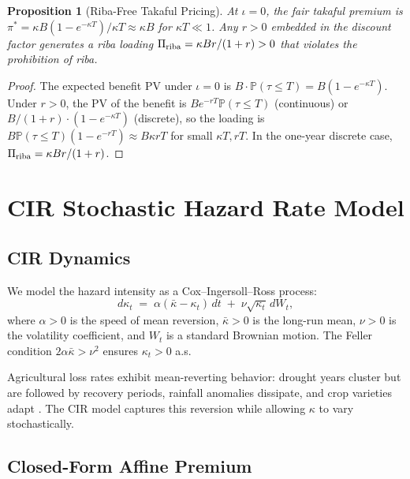 \documentclass[12pt,a4paper]{article}
\newtheorem{proposition}[theorem]{Proposition}
\newcommand{\kbar}{\bar{\kappa}}
\newcommand{\Prob}{\mathbb{P}}
\begin{document}
\begin{proposition}[Riba-Free Takaful Pricing]
  \label{prop:riba_free}
  At $\iota=0$, the fair takaful premium is $\pi^* = \kappa B(1-e^{-\kappa T})/\kappa T
  \approx \kappa B$ for $\kappa T \ll 1$.
  Any $r>0$ embedded in the discount factor generates a riba loading
  $\Pi_{\rm riba} = \kappa B r/(1+r) > 0$ that violates the prohibition of riba.
\end{proposition}

\begin{proof}
  The expected benefit PV under $\iota=0$ is $B\cdot\Prob(\tau\leq T)=B(1-e^{-\kappa T})$.
  Under $r>0$, the PV of the benefit is $B e^{-rT}\Prob(\tau\leq T)$ (continuous) or
  $B/(1+r)\cdot(1-e^{-\kappa T})$ (discrete), so the loading is
  $B\Prob(\tau\leq T)(1-e^{-rT})\approx B\kappa r T$ for small $\kappa T,rT$.
  In the one-year discrete case, $\Pi_{\rm riba}=\kappa B r/(1+r)$.
\end{proof}

\section{CIR Stochastic Hazard Rate Model}
\label{sec:cir}

\subsection{CIR Dynamics}

We model the hazard intensity as a Cox--Ingersoll--Ross process:
\begin{equation}
  d\kappa_t \;=\; \alpha(\kbar - \kappa_t)\,dt \;+\; \nu\sqrt{\kappa_t}\,dW_t,
  \label{eq:cir}
\end{equation}
where $\alpha>0$ is the speed of mean reversion, $\kbar>0$ is the long-run mean,
$\nu>0$ is the volatility coefficient, and $W_t$ is a standard Brownian motion.
The Feller condition $2\alpha\kbar>\nu^2$ ensures $\kappa_t>0$ a.s.

Agricultural loss rates exhibit mean-reverting behavior: drought years cluster but
are followed by recovery periods, rainfall anomalies dissipate, and crop varieties
adapt \citep{Barnett2008}.
The CIR model captures this reversion while allowing $\kappa$ to vary stochastically.

\subsection{Closed-Form Affine Premium}
\end{document}
